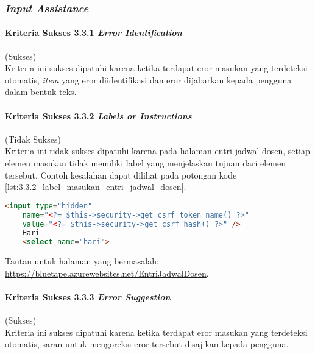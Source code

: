 \subsubsection{\textit{Input Assistance}}
\label{subsubsec:kepatuhan_bluetape_input_assistance}

\paragraph{Kriteria Sukses 3.3.1 \textit{Error Identification}}
\label{par:kepatuhan_bluetape_kriteria_sukses_3.3.1}
(Sukses)\\

Kriteria ini sukses dipatuhi karena ketika terdapat eror masukan yang terdeteksi otomatis, \textit{item} yang eror diidentifikasi dan eror dijabarkan kepada pengguna dalam bentuk teks.

\paragraph{Kriteria Sukses 3.3.2 \textit{Labels or Instructions}}
\label{par:kepatuhan_bluetape_kriteria_sukses_3.3.2}
(Tidak Sukses)\\

Kriteria ini tidak sukses dipatuhi karena pada halaman entri jadwal dosen, setiap elemen masukan tidak memiliki label yang menjelaskan tujuan dari elemen tersebut. Contoh kesalahan dapat dilihat pada potongan kode \ref{lst:3.3.2_label_masukan_entri_jadwal_dosen}.

\begin{lstlisting}[frame=single, label={lst:3.3.2_label_masukan_entri_jadwal_dosen}, language=HTML, caption=Kriteria Sukses 3.3.2 - Tidak Terdapat Label pada Kolom Masukan di Halaman Entri Jadwal Dosen]
    <input type="hidden" 
    name="<?= $this->security->get_csrf_token_name() ?>"
    value="<?= $this->security->get_csrf_hash() ?>" />
    Hari
    <select name="hari">
\end{lstlisting}
Tautan untuk halaman yang bermasalah: \url{https://bluetape.azurewebsites.net/EntriJadwalDosen}.

\paragraph{Kriteria Sukses 3.3.3 \textit{Error Suggestion}}
\label{par:kepatuhan_bluetape_kriteria_sukses_3.3.3}
(Sukses)\\

Kriteria ini sukses dipatuhi karena ketika terdapat eror masukan yang terdeteksi otomatis, saran untuk mengoreksi eror tersebut disajikan kepada pengguna.

